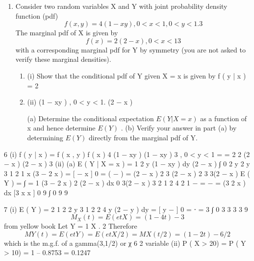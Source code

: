 \documentclass[a4paper,12pt]{article}
\begin{document}
\begin{enumerate}
\item %
Consider two random variables X and Y with joint probability density function (pdf)
\[f ( x , y ) =
4
(1 − xy ) , 0 < x < 1, 0 < y < 1 .
3\]
The marginal pdf of X is given by
\[f ( x ) =
2
(2 − x ) , 0 < x < 1
3\]
with a corresponding marginal pdf for Y by symmetry (you are not asked to verify
these marginal densities).
\begin{enumerate}
    \item (i)
Show that the conditional pdf of Y given X = x is given by
f ( y | x ) = 2
\item (ii)
(1 − xy )
, 0 < y < 1.
(2 − x )

(a) Determine the conditional expectation $E ( Y | X = x )$ as a function of x
and hence determine $E ( Y )$ .
(b) Verify your answer in part (a) by determining $E ( Y )$ directly from the
marginal pdf of Y.
\end{enumerate}
\end{enumerate}

\newpage
6
(i)
f ( y | x ) =
f ( x , y )
f ( x )
4
(1 − xy )
(1 − xy )
3
, 0 < y < 1
=
= 2
2
(2 − x )
(2 − x )
3
(ii)
(a)
E ( Y | X = x ) =
1
2
y (1 − xy ) dy
(2 − x ) ∫ 0
2
y 2
y 3 1
2
1 x
(3 − 2 x )
=
[ − x ] 0 =
( − ) =
(2 − x ) 2
3
(2 − x ) 2 3 3(2 − x )
E ( Y ) = ∫
=
1 (3 − 2 x )
2
(2 − x ) dx
0 3(2 − x ) 3
2 1
2
4
2 1
−
=
−
=
(3
2
x
)
dx
[3
x
x
]
0
9 ∫ 0
9
9


7
(i)
E ( Y ) =
2 1
2 2 y 3 1 2 2 4
y
(2
−
y
)
dy
=
[ y − ] 0 = ⋅ =
3 ∫ 0
3
3
3 3 9
\[M_X ( t ) = E ( e tX ) = (1 − 4 t ) − 3\] from yellow book
Let Y =
1
X .
2
Therefore \[M Y ( t ) = E ( e tY ) = E ( e tX / 2 ) = M X ( t / 2) = (1 − 2 t ) − 6 / 2\]
which is the m.g.f. of a gamma(3,1/2) or χ 6 2 variable
(ii)
P ( X > 20) = P ( Y > 10)
= 1 – 0.8753 = 0.1247
\end{document}

